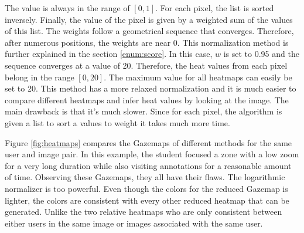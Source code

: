 \documentclass[a4paper,11pt]{report}
\numberwithin{figure}{section} %
\begin{document}
\begin{itemize}
\begin{itemize}
            The value is always in the range of $[0,1]$.
            For each pixel, the list is sorted inversely.
            Finally, the value of the pixel is given by a weighted sum of the values of this list.
            The weights follow a geometrical sequence that converges.
            Therefore, after numerous positions, the weights are near 0.
            This normalization method is further explained in the section \ref{enum:score}.
            In this case, $w$ is set to 0.95 and the sequence converges at a value of 20.
            Therefore, the heat values from each pixel belong in the range $[0,20]$.
            The maximum value for all heatmaps can easily be set to 20.
            This method has a more relaxed normalization and it is much easier to compare different heatmaps and infer heat values by looking at the image.
            The main drawback is that it's much slower.
            Since for each pixel, the algorithm is given a list to sort a values to weight it takes much more time.
        \end{itemize}
        Figure \ref{fig:heatmaps} compares the Gazemaps of different methods for the same user and image pair.
        In this example, the student focused a zone with a low zoom for a very long duration while also visiting annotations for a reasonable amount of time.
        Observing these Gazemaps, they all have their flaws.
        The logarithmic normalizer is too powerful.
        Even though the colors for the reduced Gazemap is lighter, the colors are consistent with every other reduced heatmap that can be generated.
        Unlike the two relative heatmaps who are only consistent between either users in the same image or images associated with the same user.


\end{itemize}
\end{document}
